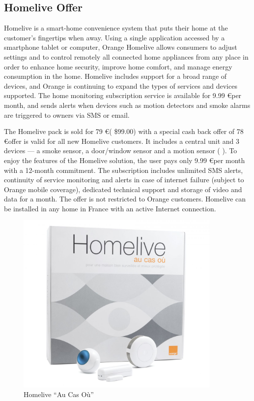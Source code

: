 \subsection{Homelive Offer}

Homelive is a smart-home convenience system that puts their home at the customer’s fingertips when away. Using a single application accessed by a smartphone tablet or computer, Orange Homelive allows consumers to adjust settings and to control remotely all connected home appliances from any place in order to enhance home security, improve home comfort, and manage energy consumption in the home. Homelive includes support for a broad range of devices, and Orange is continuing to expand the types of services and devices supported. The home monitoring subscription service is available for 9.99 \euro per month, and sends alerts when devices such as motion detectors and smoke alarms are triggered to owners via SMS or email.

The Homelive pack is sold for 79 \euro ( \$99.00) with a special cash back offer of 78 \euro  offer is valid for all new Homelive customers. It includes a central unit and 3 devices — a smoke sensor, a door/window sensor and a motion sensor ( ). To enjoy the features of the Homelive solution, the user pays only 9.99 \euro  per month with a 12-month commitment. The subscription includes unlimited SMS alerts, continuity of service monitoring and alerts in case of internet failure (subject to Orange mobile coverage), dedicated technical support and storage of video and data for a month. The offer is not restricted to Orange customers. Homelive can be installed in any home in France with an active Internet connection.%

\begin{figure}[htbp]
	\centering
		\includegraphics[width=10cm]{Figures/Pack_Accesoires_Homelive.jpg}
	\caption[Homelive ``Au Cas Où'']{Homelive ``Au Cas Où''}%
	\label{fig:1}
\end{figure}

